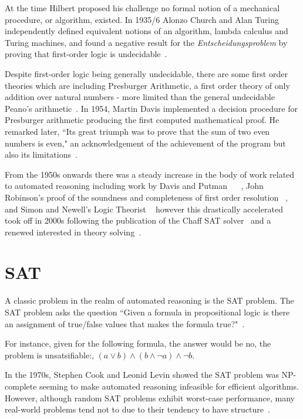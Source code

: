 \documentclass[]{final_report}
\begin{document}
At the time Hilbert proposed his challenge no formal notion of a mechanical procedure, or algorithm, existed. In 1935/6 Alonzo Church and Alan Turing independently defined equivalent notions of an algorithm, lambda calculus and Turing machines, and found a negative result for the \textit{Entscheidungsproblem}  by proving that first-order logic is undecidable~\cite{turingchurchproof}.

Despite first-order logic being generally undecidable, there are some first order theories which are including Presburger Arithmetic, a first order theory of only addition over natural numbers - more limited than the general undecidable Peano's arithmetic~\cite{automatedreasoningbooklet2004}. In 1954, Martin Davis implemented a decision procedure for Presburger arithmetic producing the first computed mathematical proof. He remarked later, ``Its great triumph was to prove that the sum of two even numbers is even," an acknowledgement of the achievement of the program but also its limitations~\cite{excapebarrettriseofsmt, automatedreasoningbooklet2004}.

From the 1950s onwards there was a steady increase in the body of work related to automated reasoning including work by Davis and Putman ~\cite{Davis:1960:CPQ:321033.321034} ~\cite{Davis:1962:MPT:368273.368557}, John Robinson's proof of the soundness and completeness of first order resolution ~\cite{robinson1965machine}, and Simon and Newell's Logic Theorist ~\cite{newell1956logic} however this drastically accelerated took off in 2000s following the publication of the Chaff SAT solver~\cite{moskewicz2001chaff} and a renewed interested in theory solving~\cite{excapebarrettriseofsmt}.

\section{SAT}
A classic problem in the realm of automated reasoning is the SAT problem. The SAT problem asks the question ``Given a formula in propositional logic is there an assignment of true/false values that makes the formula true?"~\cite{smtwheredowegofromhere}.

For instance, given for the following formula, the answer would be no, the problem is unsatsifiable:,  $(a \lor b) \land (b \land \lnot a) \land \lnot b $.

In the 1970s, Stephen Cook and Leonid Levin showed the SAT problem was NP-complete seeming to make automated reasoning infeasible for efficient algorithms. However, although random SAT problems exhibit worst-case performance, many real-world problems tend not to due to their tendency to have structure~\cite{smtwheredowegofromhere}.
\end{document}
